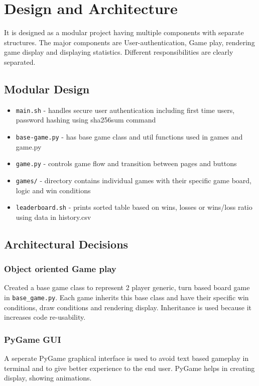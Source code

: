 \documentclass[12pt, letterpaper]{article}
\begin{document}
\section{Design and Architecture}
It is designed as a modular project having multiple components with separate structures. The major components are User-authentication, Game play, rendering game display and displaying statistics. 
Different responsibilities are clearly separated.

\subsection{Modular Design}
\begin{itemize}
    \item \texttt{main.sh} - handles secure user authentication including first time users, password hashing using sha256sum command 
    \item \texttt{base-game.py} - has base game class and util functions used in games and game.py
    \item \texttt{game.py} - controls game flow and transition between pages and buttons
    \item \texttt{games/} - directory contains individual games with their specific game board, logic and win conditions
    \item \texttt{leaderboard.sh} - prints sorted table based on wins, losses or wins/loss ratio using data in history.csv
\end{itemize}

\subsection{Architectural Decisions}
\subsubsection{Object oriented Game play}
Created a base game class to represent 2 player generic, turn based board game in \texttt{base\_game.py}. Each game inherits this base class and have their specific win conditions, draw conditions and rendering display.
Inheritance is used because it increases code re-usability.

\subsubsection{PyGame GUI}
A seperate PyGame graphical interface is used to avoid text based gameplay in terminal and to give better experience to the end user. PyGame helps in creating display, showing animations.
\end{document}
